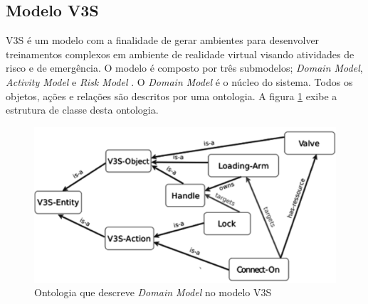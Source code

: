 \subsection{Modelo V3S}

V3S é um modelo com a finalidade de gerar ambientes para desenvolver treinamentos complexos em ambiente de realidade virtual visando atividades de risco e de emergência. O modelo é composto por três submodelos; \textit{Domain Model}, \textit{Activity Model} e \textit{Risk Model} \cite{v3sframework}. O \textit{Domain Model} é o núcleo do sistema. Todos os objetos, ações e relações são descritos por uma ontologia. 
A figura \ref{domainmodel} exibe a estrutura de classe desta ontologia.

\begin{figure}[H]
  \centering
  \includegraphics[width=0.5\linewidth]{figure/ontologyv3.png} 
  \caption{Ontologia que descreve \textit{Domain Model} no modelo V3S \cite{v3sframework}}
  \label{domainmodel}
\end{figure}

